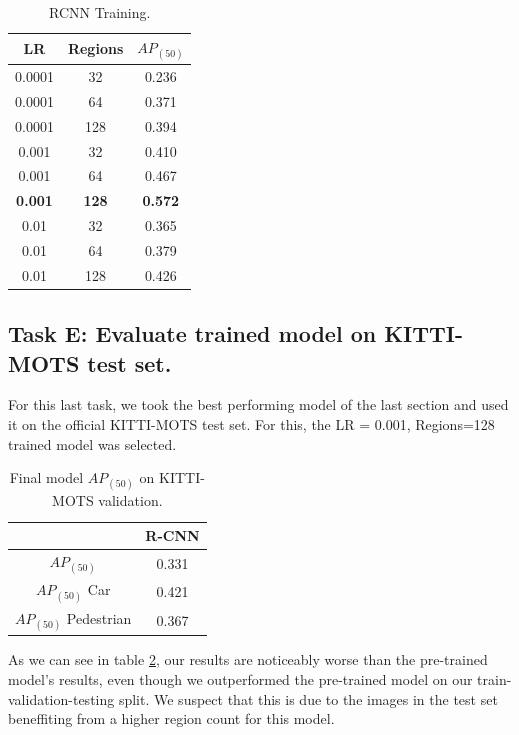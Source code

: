 \documentclass[12pt,a4paper,twocolumn,twoside]{article}
\begin{document}
\begin{table}[ht]
    \centering
    \begin{tabular}{|c | c || c|} 
        \hline
        \textbf{LR} & \textbf{Regions} & \textbf{$AP_{(50)}$} \\ [0.8ex] 
            \hline
            0.0001 & 32 & 0.236 \\ 
            \hline
            0.0001 & 64 & 0.371\\ 
            \hline
            0.0001 & 128 & 0.394 \\ 
            \hline
            0.001 & 32 & 0.410\\ 
            \hline
            0.001 & 64 & 0.467\\ 
            \hline
            \textbf{0.001} & \textbf{128} & \textbf{0.572}\\ 
            \hline
            0.01 & 32 & 0.365\\ 
            \hline
            0.01 & 64 & 0.379\\ 
            \hline
            0.01 & 128 & 0.426\\ 
         \hline
    \end{tabular}
    \caption{\label{table:RCNN_Table_training}RCNN Training.}
\end{table}

\subsection{Task E: Evaluate trained model on KITTI-MOTS test set.}

For this last task, we took the best performing model of the last section and used
it on the official KITTI-MOTS test set. For this, the LR = 0.001, Regions=128 
trained model was selected. 


\begin{table}[ht]
    \centering
    \begin{tabular}{|c || c |} 
        \hline
          & \textbf{R-CNN}\\ [0.8ex] 
          \hline
         $AP_{(50)}$ & 0.331\\ 
         \hline
         $AP_{(50)}$ Car & 0.421\\
         \hline
         $AP_{(50)}$ Pedestrian & 0.367\\
         \hline
    \end{tabular}
    \caption{\label{table:KITTI-MOTS-FINAL}Final model $AP_{(50)}$ on KITTI-MOTS validation.}
\end{table}

As we can see in table \ref{table:KITTI-MOTS-FINAL}, our results are noticeably 
worse than the pre-trained model's results, even though we outperformed 
the pre-trained model on our train-validation-testing split. We suspect that this is due
to the images in the test set beneffiting from a higher region count for this model.

\printbibliography
\end{document}
